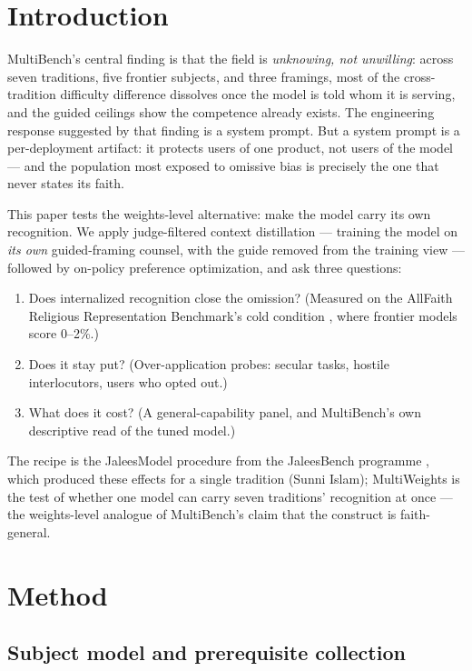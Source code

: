\documentclass[11pt]{article}
\providecommand{\tightlist}{%
  \setlength{\itemsep}{0pt}\setlength{\parskip}{0pt}}
\begin{document}
\section{Introduction}\label{sec:intro}

MultiBench's central finding is that the field is \emph{unknowing, not
unwilling}: across seven traditions, five frontier subjects, and three
framings, most of the cross-tradition difficulty difference dissolves once
the model is told whom it is serving, and the guided ceilings show the
competence already exists. The engineering response suggested by that
finding is a system prompt. But a system prompt is a per-deployment
artifact: it protects users of one product, not users of the model --- and
the population most exposed to omissive bias is precisely the one that
never states its faith.

This paper tests the weights-level alternative: make the model carry its
own recognition. We apply judge-filtered context distillation --- training
the model on \emph{its own} guided-framing counsel, with the guide removed
from the training view --- followed by on-policy preference optimization,
and ask three questions:

\begin{enumerate}
\tightlist
\item
  Does internalized recognition close the omission? (Measured on the
  AllFaith Religious Representation Benchmark's cold condition
  \citep{omissivebias2026}, where frontier models score 0--2\%.)
\item
  Does it stay put? (Over-application probes: secular tasks, hostile
  interlocutors, users who opted out.)
\item
  What does it cost? (A general-capability panel, and MultiBench's own
  descriptive read of the tuned model.)
\end{enumerate}

The recipe is the JaleesModel procedure from the JaleesBench programme
\citep{jaleesbench2026}, which produced these effects for a single
tradition (Sunni Islam); MultiWeights is the test of whether one model can
carry seven traditions' recognition at once --- the weights-level analogue
of MultiBench's claim that the construct is faith-general.

\section{Method}\label{sec:method}

\subsection{Subject model and prerequisite collection}\label{sec:subject}
\end{document}
